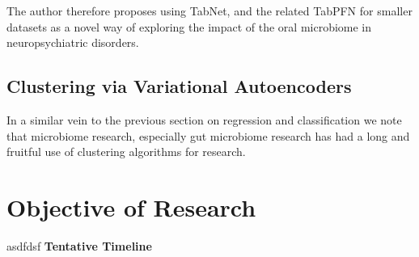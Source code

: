 \documentclass{article}
\begin{document}
\begin{multicols}{2}
The author therefore proposes using TabNet, and the related TabPFN \cite{hollmann2022tabpfn} for smaller datasets as a novel way of exploring the impact of the oral microbiome in neuropsychiatric disorders.
\subsection{Clustering via Variational Autoencoders}
In a similar vein to the previous section on regression and classification we note that microbiome research, especially gut microbiome research has had a long and fruitful use of clustering algorithms for research. 
\section{Objective of Research}
asdfdsf
\textbf{Tentative Timeline}
\end{multicols}


\end{document}
